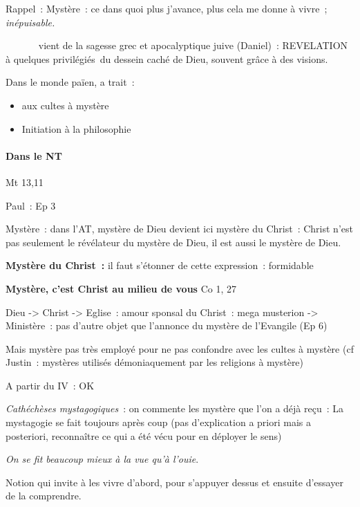 Rappel~: Mystère~: ce dans quoi plus j'avance, plus cela me donne à
vivre~; \emph{inépuisable.}

 vient de la sagesse grec et apocalyptique juive (Daniel)~:
REVELATION à quelques privilégiés~du dessein caché de Dieu, souvent
grâce à des visions.

Dans le monde païen, a trait~:

\begin{itemize}
\item
   
  aux cultes à mystère
   
\item
   
  Initiation à la philosophie
   
\end{itemize}

\hypertarget{dans-le-nt}{%
\paragraph{Dans le NT}\label{dans-le-nt}}

Mt 13,11

Paul~: Ep 3

Mystère~: dans l'AT, mystère de Dieu devient ici mystère du Christ~:
Christ n'est pas seulement le révélateur du mystère de Dieu, il est
aussi le mystère de Dieu.

\textbf{Mystère du Christ~:} il faut s'étonner de cette expression~:
formidable

\textbf{Mystère, c'est Christ au milieu de vous} Co 1, 27

Dieu -\textgreater{} Christ -\textgreater{} Eglise~: amour sponsal du
Christ~: mega musterion -\textgreater{} Ministère~: pas d'autre objet
que l'annonce du mystère de l'Evangile (Ep 6)

Mais mystère pas très employé pour ne pas confondre avec les cultes à
mystère (cf Justin~: mystères utilisés démoniaquement par les religions
à mystère)

A partir du IV~: OK

\emph{Cathéchèses mystagogiques}~: on commente les mystère que l'on a
déjà reçu~: La mystagogie se fait toujours après coup (pas d'explication
a priori mais a posteriori, reconnaître ce qui a été vécu pour en
déployer le sens)

\emph{On se fit beaucoup mieux à la vue qu'à l'ouie}.

Notion qui invite à les vivre d'abord, pour s'appuyer dessus et ensuite
d'essayer de la comprendre.


